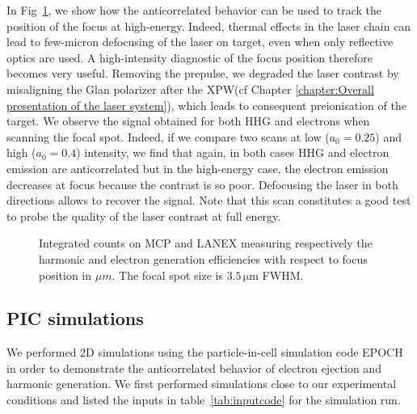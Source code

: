 \noindent In Fig~\ref{fig:20140808FocusScanElectronVShhgs}, we show how the anticorrelated behavior can be used to track the position of the focus at high-energy. Indeed, thermal effects in the laser chain can lead to few-micron defocusing of the laser on target, even when only reflective optics are used. A high-intensity diagnostic of the focus position therefore becomes very useful.
\noindent Removing the prepulse, we degraded the laser contrast by misaligning the Glan polarizer after the XPW(cf Chapter \ref{chapter:Overall presentation of the laser system}), which leads to consequent preionisation of the target. We observe the signal obtained for both HHG and electrons when scanning the focal spot. Indeed, if we compare two scans at low ($a_0 = 0.25$) and high ($a_0=0.4$) intensity, we find that again, in both cases HHG and electron emission are anticorrelated but in the high-energy case, the electron emission decreases at focus because the contrast is so poor. Defocusing the laser in both directions allows to recover the signal. Note that this scan constitutes a good test to probe the quality of the laser contrast at full energy.



\begin{figure}[H]
\begin{center}
\end{center}
\caption{\label{fig:20140808FocusScanElectronVShhgs} Integrated counts on MCP and LANEX measuring respectively the harmonic and electron generation efficiencies with respect to focus position in $\mu m$. The focal spot size is $3.5\,\mathrm{\mu m}$ FWHM.}
\end{figure}




\subsection{PIC simulations}

We performed 2D simulations using  the particle-in-cell simulation code EPOCH~\cite{arber2015contemporary} in order to demonstrate the anticorrelated behavior of electron ejection and harmonic generation. We first performed simulations close to our experimental conditions and listed the inputs in table~\ref{tab:inputcode} for the  simulation run.\\


